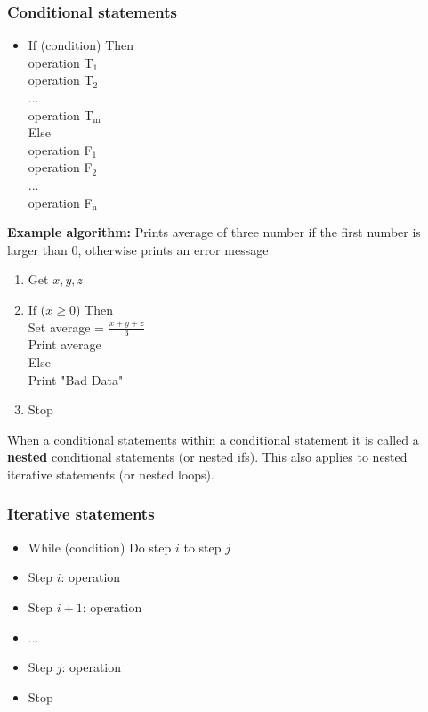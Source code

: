 \documentclass[]{article}
\begin{document}
\subsubsection{Conditional statements}
\bigbreak
\begin{itemize}
	\item If (condition) Then\\
				\tabto{0.5cm}operation T$_1$\\
				\tabto{0.5cm}operation T$_2$\\ 
				\tabto{0.5cm}...\\
				\tabto{0.5cm}operation T$_\mathrm{m}$\\
			Else\\
				\tabto{0.5cm}operation F$_1$\\
				\tabto{0.5cm}operation F$_2$\\ 
				\tabto{0.5cm}...\\
				\tabto{0.5cm}operation F$_\mathrm{n}$\smallskip
\end{itemize}

\noindent \textbf{Example algorithm:} Prints average of three number if the first number is larger than 0, otherwise prints an error message
\begin{enumerate}
	\item Get $x, y, z$
	\item If ($x \geq 0$) Then\\
			\tabto{0.5cm}Set average = $\frac{x + y + z}{3}$\\
			\tabto{0.5cm}Print average\\
		Else\\
			\tabto{0.5cm}Print "Bad Data"
	\item Stop\smallskip
\end{enumerate}

\noindent When a conditional statements within a conditional statement it is called a \textbf{nested} conditional statements (or nested ifs). This also applies to nested iterative statements (or nested loops).


\subsubsection{Iterative statements}
\bigbreak
\begin{itemize}
	\item While (condition) Do step $i$ to step $j$ \setlength{\itemindent}{0.5cm}
		\item Step $i$: operation
		\item Step $i + 1$: operation
		\item ...
		\item Step $j$: operation
	\setlength{\itemindent}{0cm}\item Stop\smallskip
\end{itemize}
\end{document}

